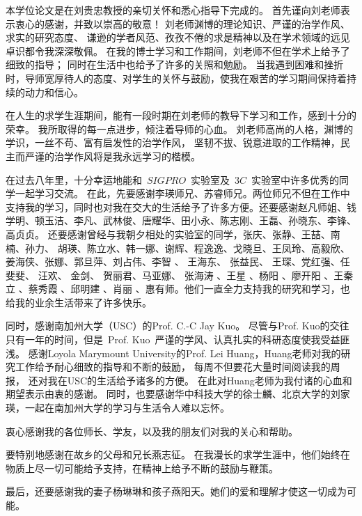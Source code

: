 \par 本学位论文是在刘贵忠教授的亲切关怀和悉心指导下完成的。 首先谨向刘老师表示衷心的感谢，并致以崇高的敬意！
刘老师渊博的理论知识、严谨的治学作风、求实的研究态度、
谦逊的学者风范、孜孜不倦的求是精神以及在学术领域的远见卓识都令我深深敬佩。
在我的博士学习和工作期间，刘老师不但在学术上给予了细致的指导； 同时在生活中也给予了许多的关照和勉励。
当我遇到困难和挫折时，导师宽厚待人的态度、对学生的关怀与鼓励，使我在艰苦的学习期间保持着持续的动力和信心。

在人生的求学生涯期间，能有一段时期在刘老师的教导下学习和工作，感到十分的荣幸。
我所取得的每一点进步，倾注着导师的心血。
刘老师高尚的人格，渊博的学识，一丝不苟、富有启发性的治学作风，
坚韧不拔、锐意进取的工作精神，民主而严谨的治学作风将是我永远学习的楷模。

\par 在过去八年里，十分幸运地能和~$SIGPRO$~实验室及~$3C$~实验室中许多优秀的同学一起学习交流。
在此，先要感谢李瑛师兄、苏睿师兄。两位师兄不但在工作中支持我的学习，同时也对我在交大的生活给予了许多方便。还要感谢赵凡师姐、钱学明、顿玉洁、李凡、武林俊、唐耀华、田小永、陈志刚、王磊、孙晓东、李锋、高贞贞。
还要感谢曾经与我朝夕相处的实验室的同学，张庆、张静、王喆、南楠、孙力、 胡瑛、陈立水、韩一娜、谢辉、程逸逸、戈晓旦、王凤玲、高毅欣、姜海侠、张娜、郭旦萍、刘占伟、李智 、 王海东、 张益民、 王琛、党红强、任斐斐、 汪欢、 金剑、 贺丽君、马亚娜、 张海涛 、王星 、杨阳 、廖开阳 、王秦立 、蔡秀霞 、邱明建 、肖丽 、惠有师。他们一直全力支持我的研究和学习，也给我的业余生活带来了许多快乐。

\par 同时，感谢南加州大学（USC）的Prof. C.-C Jay Kuo。
尽管与Prof. Kuo的交往只有一年的时间，但是~Prof. Kuo~严谨的学风、认真扎实的科研态度使我受益匪浅。
感谢Loyola Marymount University的Prof. Lei Huang，Huang老师对我的研究工作给予耐心细致的指导和不断的鼓励，
每周不但要花大量时间阅读我的周报，
还对我在USC的生活给予诸多的方便。
在此对Huang老师为我付诸的心血和期望表示由衷的感谢。
同时，也要感谢华中科技大学的徐士麟、北京大学的刘家瑛，一起在南加州大学的学习与生活令人难以忘怀。

\par 衷心感谢我的各位师长、学友，以及我的朋友们对我的关心和帮助。 
\par 要特别地感谢在故乡的父母和兄长燕志征。 在我漫长的求学生涯中，他们始终在物质上尽一切可能给予支持，在精神上给予不断的鼓励与鞭策。
\par 最后，还要感谢我的妻子杨琳琳和孩子燕阳天。她们的爱和理解才使这一切成为可能。
